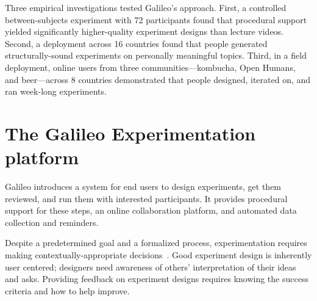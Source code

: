Three empirical investigations tested Galileo's approach. First, a controlled between-subjects experiment with 72 participants found that procedural support yielded significantly higher-quality experiment designs than lecture videos. Second, a deployment across 16 countries found that people generated structurally-sound experiments on personally meaningful topics. Third, in a field deployment, online users from three communities---kombucha, Open Humans, and beer---across 8 countries demonstrated that people designed, iterated on, and ran week-long experiments.

\section{The Galileo Experimentation platform}

Galileo introduces a system for end users to design experiments, get them reviewed, and run them with interested participants. It provides procedural support for these steps, an online collaboration platform, and automated data collection and reminders.

Despite a predetermined goal and a formalized process, experimentation requires making contextually-appropriate decisions~\cite{Martin2007}. Good experiment design is inherently user centered; designers need awareness of others' interpretation of their ideas and asks. Providing feedback on experiment designs requires knowing the success criteria and how to help improve.


